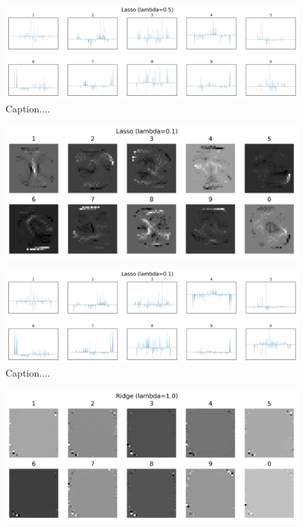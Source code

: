 \documentclass[10pt]{article}
\begin{document}
\begin{figure}[ht]
\centerline{\includegraphics[scale=0.5]{figures/bar_plot_loadings_lasso_05.png}}
\caption{Caption....}
\label{fig6b}
\end{figure}

\begin{figure}[ht]
\centerline{\includegraphics[scale=0.8]{figures/weight_matrix_lasso_01.png}}
\label{fig7a}
\end{figure}

\begin{figure}[ht]
\centerline{\includegraphics[scale=0.5]{figures/bar_plot_loadings_lasso_01.png}}
\caption{Caption....}
\label{fig7b}
\end{figure}

\begin{figure}[ht]
\centerline{\includegraphics[scale=0.8]{figures/weight_matrix_ridge.png}}
\label{fig8a}
\end{figure}
\end{document}
